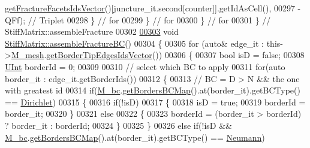\begin{DoxyCode}
      \hyperlink{classFVCode3D_1_1Rigid__Mesh_aadbe6d9ad704122537903396d91238e0}{getFractureFacetsIdsVector}()[juncture\_it.second[counter]].getIdAsCell(),
00297                     -QFf);  \textcolor{comment}{// Triplet}
00298             \} \textcolor{comment}{// for}
00299         \} \textcolor{comment}{// for}
00300     \} \textcolor{comment}{// for}
00301 \} \textcolor{comment}{// StiffMatrix::assembleFracture}
00302 
\hypertarget{Stiffness_8cpp_source.tex_l00303}{}\hyperlink{classFVCode3D_1_1StiffMatrix_af7e80d2641fc41174eb4cb56e2f119d4}{00303} \textcolor{keywordtype}{void} \hyperlink{classFVCode3D_1_1StiffMatrix_af7e80d2641fc41174eb4cb56e2f119d4}{StiffMatrix::assembleFractureBC}()
00304 \{
00305     \textcolor{keywordflow}{for} (\textcolor{keyword}{auto}& edge\_it : this->\hyperlink{classFVCode3D_1_1MatrixHandler_a72f185cb557fc2e8023bd09a074f685c}{M\_mesh}.\hyperlink{classFVCode3D_1_1Rigid__Mesh_a12c92b683cfb3d9ac2645f038a8c6220}{getBorderTipEdgesIdsVector}())
00306     \{
00307         \textcolor{keywordtype}{bool} isD = \textcolor{keyword}{false};
00308         \hyperlink{namespaceFVCode3D_a4bf7e328c75d0fd504050d040ebe9eda}{UInt} borderId = 0;
00309 
00310         \textcolor{comment}{// select which BC to apply}
00311         \textcolor{keywordflow}{for}(\textcolor{keyword}{auto} border\_it : edge\_it.getBorderIds())
00312         \{
00313             \textcolor{comment}{// BC = D > N && the one with greatest id}
00314             \textcolor{keywordflow}{if}(\hyperlink{classFVCode3D_1_1StiffMatrix_a23e3ffc97fcf112958e9966cac41e9d3}{M\_bc}.\hyperlink{classFVCode3D_1_1BoundaryConditions_a5b53a81bdab88709fae14892bfe6a7c9}{getBordersBCMap}().at(border\_it).getBCType() == 
      \hyperlink{namespaceFVCode3D_a73660061f11f1671164ce171a053f8c5a192024697bdaa4fbbb39b8961b747bce}{Dirichlet})
00315             \{
00316                 \textcolor{keywordflow}{if}(!isD)
00317                 \{
00318                     isD = \textcolor{keyword}{true};
00319                     borderId = border\_it;
00320                 \}
00321                 \textcolor{keywordflow}{else}
00322                 \{
00323                     borderId = (border\_it > borderId) ? border\_it : borderId;
00324                 \}
00325             \}
00326             \textcolor{keywordflow}{else} \textcolor{keywordflow}{if}(!isD && \hyperlink{classFVCode3D_1_1StiffMatrix_a23e3ffc97fcf112958e9966cac41e9d3}{M\_bc}.\hyperlink{classFVCode3D_1_1BoundaryConditions_a5b53a81bdab88709fae14892bfe6a7c9}{getBordersBCMap}().at(border\_it).getBCType() == 
      \hyperlink{namespaceFVCode3D_a73660061f11f1671164ce171a053f8c5a30212425b27314b01b40f4984dbf850a}{Neumann})

\end{DoxyCode}

